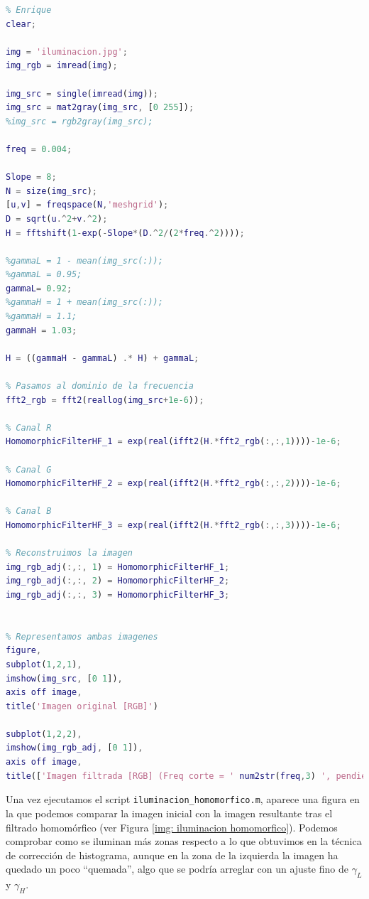 \documentclass[12pt]{article}
\begin{document}
	\begin{lstlisting}[language=Matlab, caption={Implementación iluminación utilizando filtrado homomórfico en \texttt{MATLAB}}]
% 3 - Iluminacion usando filtro homomorfico
% Enrique
clear;

img = 'iluminacion.jpg';
img_rgb = imread(img);

img_src = single(imread(img));
img_src = mat2gray(img_src, [0 255]);
%img_src = rgb2gray(img_src);

freq = 0.004;

Slope = 8; 
N = size(img_src);
[u,v] = freqspace(N,'meshgrid'); 
D = sqrt(u.^2+v.^2);
H = fftshift(1-exp(-Slope*(D.^2/(2*freq.^2))));

%gammaL = 1 - mean(img_src(:));
%gammaL = 0.95;
gammaL= 0.92;
%gammaH = 1 + mean(img_src(:));
%gammaH = 1.1;
gammaH = 1.03;

H = ((gammaH - gammaL) .* H) + gammaL;

% Pasamos al dominio de la frecuencia
fft2_rgb = fft2(reallog(img_src+1e-6));

% Canal R
HomomorphicFilterHF_1 = exp(real(ifft2(H.*fft2_rgb(:,:,1))))-1e-6;

% Canal G
HomomorphicFilterHF_2 = exp(real(ifft2(H.*fft2_rgb(:,:,2))))-1e-6;

% Canal B
HomomorphicFilterHF_3 = exp(real(ifft2(H.*fft2_rgb(:,:,3))))-1e-6;

% Reconstruimos la imagen
img_rgb_adj(:,:, 1) = HomomorphicFilterHF_1;
img_rgb_adj(:,:, 2) = HomomorphicFilterHF_2;
img_rgb_adj(:,:, 3) = HomomorphicFilterHF_3;


% Representamos ambas imagenes
figure,
subplot(1,2,1), 
imshow(img_src, [0 1]),
axis off image,
title('Imagen original [RGB]')

subplot(1,2,2),
imshow(img_rgb_adj, [0 1]),
axis off image,
title(['Imagen filtrada [RGB] (Freq corte = ' num2str(freq,3) ', pendiente = ' num2str(Slope,3) ', \gamma_L = ' num2str(gammaL,3) ', \gamma_H = ' num2str(gammaH,3) ')'])
	\end{lstlisting}

	\vspace{10px}

	\noindent Una vez ejecutamos el script \texttt{iluminacion\_homomorfico.m}, aparece una figura en la que podemos comparar la imagen inicial con la imagen resultante tras el filtrado homomórfico (ver Figura \ref{img: iluminacion homomorfico}). Podemos comprobar como se iluminan más zonas respecto a lo que obtuvimos en la técnica de corrección de histograma, aunque en la zona de la izquierda la imagen ha quedado un poco ``quemada'', algo que se podría arreglar con un ajuste fino de $\gamma_L$ y $\gamma_H$.
	
\end{document}
